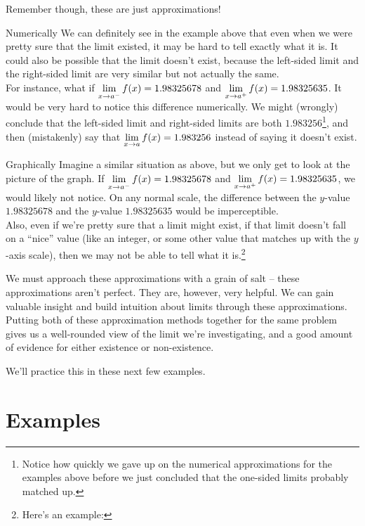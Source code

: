 Remember though, these are just approximations!
\begin{defn}{Numerically}
  We can definitely see in the example above that even when we were pretty sure that the limit existed, it may be hard to tell exactly what it is.
  It could also be possible that the limit doesn't exist, because the left-sided limit and the right-sided limit are very similar but not actually the same.\\

  For instance, what if $\displaystyle \lim_{x\to a^-} f(x) = 1.98325678$ and $\displaystyle \lim_{x\to a^+} f(x) = 1.98325635$.
  It would be very hard to notice this difference numerically.
  We might (wrongly) conclude that the left-sided limit and right-sided limits are both $1.983256$\footnote{Notice how quickly we gave up on the numerical approximations for the examples above before we just concluded that the one-sided limits probably matched up.}, and then (mistakenly) say that $\displaystyle \lim_{x\to a} f(x)=1.983256$ instead of saying it doesn't exist.
\end{defn}

\begin{defn}{Graphically}
  Imagine a similar situation as above, but we only get to look at the picture of the graph.
  If $\displaystyle \lim_{x\to a^-} f(x) = 1.98325678$ and $\displaystyle \lim_{x\to a^+} f(x) = 1.98325635$, we would likely not notice.
  On any normal scale, the difference between the $y$-value $1.98325678$ and the $y$-value $1.98325635$ would be imperceptible.\\

  Also, even if we're pretty sure that a limit might exist, if that limit doesn't fall on a ``nice'' value (like an integer, or some other value that matches up with the $y$-axis scale), then we may not be able to tell what it is.\footnote{Here's an example:
  }
\end{defn}

We must approach these approximations with a grain of salt -- these approximations aren't perfect.
They are, however, very helpful.
We can gain valuable insight and build intuition about limits through these approximations.
Putting both of these approximation methods together for the same problem gives us a well-rounded view of the limit we're investigating, and a good amount of evidence for either existence or non-existence.

We'll practice this in these next few examples.

\section*{Examples}



